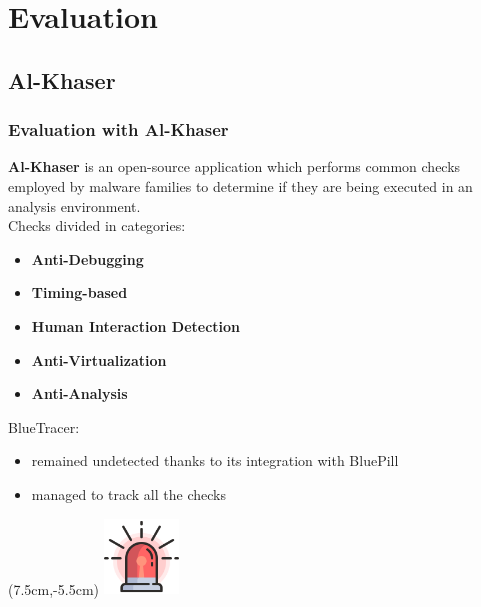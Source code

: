 \documentclass[compress]{beamer}
\begin{document}
\section{Evaluation}

\subsection{Al-Khaser}
\begin{frame}
    \frametitle{Evaluation with Al-Khaser}
	\textbf{Al-Khaser} is an open-source application which performs common checks employed by malware families to determine if they are being
executed in an analysis environment.
\\\medskip
Checks divided in categories:
\begin{itemize}
\item \textbf{Anti-Debugging}
\item \textbf{Timing-based}
\item \textbf{Human Interaction Detection}
\item \textbf{Anti-Virtualization}
\item \textbf{Anti-Analysis}
\end{itemize}
\medskip
\begin{beamerboxesrounded}[shadow=true]{}
BlueTracer: 
\begin{itemize}
\item remained undetected thanks to its integration with BluePill
\item managed to track all the checks
\end{itemize}
\end{beamerboxesrounded}

    \begin{textblock*}{3cm}(7.5cm,-5.5cm)
   \includegraphics[width=2cm]{image/lights.png}%
	\end{textblock*}

\end{frame}
\end{document}

